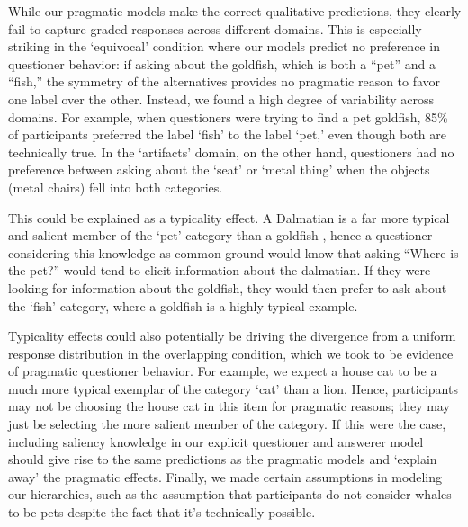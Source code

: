 \documentclass[12pt, floatsintext, jou]{apa6}
\begin{document}
While our pragmatic models make the correct qualitative predictions, they clearly fail to capture graded responses across different domains. This is especially striking in the `equivocal' condition where our models predict no preference in questioner behavior: if asking about the goldfish, which is both a ``pet'' and a ``fish,'' the symmetry of the alternatives provides no pragmatic reason to favor one label over the other. Instead, we found a high degree of variability across domains. For example, when questioners were trying to find a pet goldfish, 85\% of participants preferred the label `fish' to the label `pet,' even though both are technically true. In the `artifacts' domain, on the other hand, questioners had no preference between asking about the `seat' or `metal thing' when the objects (metal chairs) fell into both categories.%

This could be explained as a typicality effect. A Dalmatian is a far more typical and salient member of the `pet' category than a goldfish \cite{Rosch75}, hence a questioner considering this knowledge as common ground would know that asking ``Where is the pet?'' would tend to elicit information about the dalmatian. If they were looking for information about the goldfish, they would then prefer to ask about the `fish' category, where a goldfish is a highly typical example. 

Typicality effects could also potentially be driving the divergence from a uniform response distribution in the overlapping condition, which we took to be evidence of pragmatic questioner behavior. For example, we expect a house cat to be a much more typical exemplar of the category `cat' than a lion. Hence, participants may not be choosing the house cat in this item for pragmatic reasons; they may just be selecting the more salient member of the category. If this were the case, including saliency knowledge in our explicit questioner and answerer model should give rise to the same predictions as the pragmatic models and `explain away' the pragmatic effects. Finally, we made certain assumptions in modeling our hierarchies, such as the assumption that participants do not consider whales to be pets despite the fact that it's technically possible. 
\end{document}

